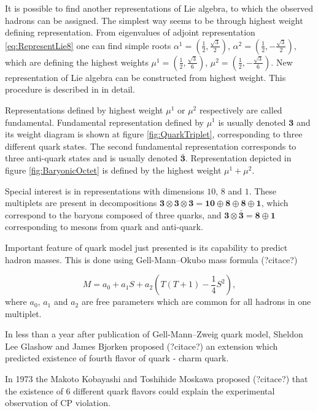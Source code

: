 \documentclass[a4paper,11pt]{report}
\begin{document}
It is possible to find another representations of Lie algebra, to which the
observed hadrons can be assigned. The simplest way seems to be through highest
weight defining representation. From eigenvalues of adjoint representation
\eqref{eq:RepresentLie8} one can find simple roots 
$\alpha^1=\left( \frac{1}{2}, \frac{\sqrt{3}}{2} \right)$, 
$\alpha^2=\left( \frac{1}{2}, - \frac{\sqrt{3}}{2} \right)$, 
which are defining the highest weights 
$\mu^1=\left( \frac{1}{2}, \frac{\sqrt{3}}{6} \right)$, 
$\mu^2=\left( \frac{1}{2}, - \frac{\sqrt{3}}{6} \right)$.
New representation of Lie algebra can be constructed from highest weight. This
procedure is described in \cite{LieAlgebrasForParticlePhysicists} in detail.

Representations defined by highest weight $\mu^1$ or $\mu^2$ respectively are
called fundamental. Fundamental representation defined by $\mu^1$ is usually
denoted $\mathbf{3}$ and its weight diagram is shown at figure
\ref{fig:QuarkTriplet}, corresponding to three different quark states. The
second fundamental representation corresponds to three anti-quark states and is
usually denoted $\bar{\mathbf{3}}$. Representation depicted in figure
\ref{fig:BaryonicOctet} is defined by the highest weight $\mu^1 + \mu^2$.

Special interest is in representations with dimensions $10$, $8$ and $1$. These
multiplets are present in decompositions $\mathbf{3} \otimes \mathbf{3} \otimes
\mathbf{3} = \mathbf{10} \oplus \mathbf{8} \oplus \mathbf{8} \oplus \mathbf{1}$,
which correspond to the baryons composed of three quarks, and $\mathbf{3}
\otimes \bar{\mathbf{3}} = \mathbf{8} \oplus \mathbf{1}$ corresponding to
mesons from quark and anti-quark.

Important feature of quark model just presented is its capability to predict
hadron masses. This is done using Gell-Mann--Okubo mass formula (?citace?)

\begin{equation}
  M = a_0 + a_1 S + a_2 \left( T(T+1) - \frac{1}{4}S^2 \right),
  \label{eq:GellMannOkubo}
\end{equation}
where $a_0$, $a_1$ and $a_2$ are free parameters which are common for all
hadrons in one multiplet. 

In less than a year after publication of Gell-Mann--Zweig quark model, Sheldon
Lee Glashow and James Bjorken proposed (?citace?) an extension which predicted
existence of fourth flavor of quark - charm quark.

In 1973 the Makoto Kobayashi and Toshihide Moskawa proposed (?citace?) that the
existence of 6 different quark flavors could explain the experimental
observation of CP violation.
\end{document}
